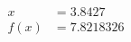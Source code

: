 \documentclass[preview]{standalone}
\begin{document}
\begin{align*}
x &= 3.8427\\f(x) &= 7.8218326
\end{align*}
\end{document}
